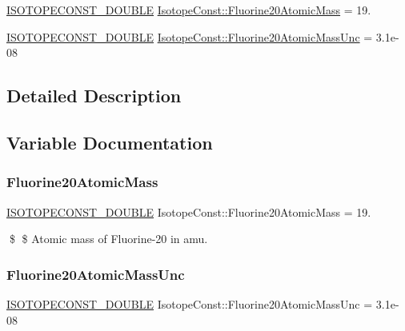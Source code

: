 \begin{DoxyCompactItemize}
\item 
\mbox{\hyperlink{group___isotope_const-_macros_ga8f45a7272ce02c0b4c65c44636ed719a}{I\+S\+O\+T\+O\+P\+E\+C\+O\+N\+S\+T\+\_\+\+D\+O\+U\+B\+LE}} \mbox{\hyperlink{group___isotope_const-_fluorine-_f20_gaa1fc23bf3114fed42131983014196b90}{Isotope\+Const\+::\+Fluorine20\+Atomic\+Mass}} = 19.
\item 
\mbox{\hyperlink{group___isotope_const-_macros_ga8f45a7272ce02c0b4c65c44636ed719a}{I\+S\+O\+T\+O\+P\+E\+C\+O\+N\+S\+T\+\_\+\+D\+O\+U\+B\+LE}} \mbox{\hyperlink{group___isotope_const-_fluorine-_f20_ga7ccfed2d87adc861189c8006172a4636}{Isotope\+Const\+::\+Fluorine20\+Atomic\+Mass\+Unc}} = 3.\+1e-\/08
\end{DoxyCompactItemize}


\subsection{Detailed Description}


\subsection{Variable Documentation}
\mbox{\label{group___isotope_const-_fluorine-_f20_gaa1fc23bf3114fed42131983014196b90}} 
\subsubsection{\texorpdfstring{Fluorine20\+Atomic\+Mass}{Fluorine20AtomicMass}}
{\footnotesize\ttfamily \mbox{\hyperlink{group___isotope_const-_macros_ga8f45a7272ce02c0b4c65c44636ed719a}{I\+S\+O\+T\+O\+P\+E\+C\+O\+N\+S\+T\+\_\+\+D\+O\+U\+B\+LE}} Isotope\+Const\+::\+Fluorine20\+Atomic\+Mass = 19.}

\$ \$ Atomic mass of Fluorine-\/20 in amu. \mbox{\label{group___isotope_const-_fluorine-_f20_ga7ccfed2d87adc861189c8006172a4636}} 
\subsubsection{\texorpdfstring{Fluorine20\+Atomic\+Mass\+Unc}{Fluorine20AtomicMassUnc}}
{\footnotesize\ttfamily \mbox{\hyperlink{group___isotope_const-_macros_ga8f45a7272ce02c0b4c65c44636ed719a}{I\+S\+O\+T\+O\+P\+E\+C\+O\+N\+S\+T\+\_\+\+D\+O\+U\+B\+LE}} Isotope\+Const\+::\+Fluorine20\+Atomic\+Mass\+Unc = 3.\+1e-\/08}

